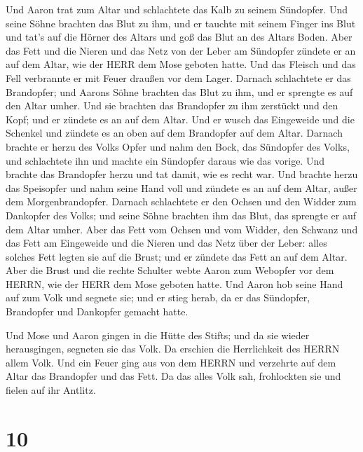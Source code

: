  Und Aaron trat zum Altar und schlachtete das Kalb zu seinem
Sündopfer.  Und seine Söhne brachten das Blut zu ihm, und er
tauchte mit seinem Finger ins Blut und tat's auf die Hörner des Altars
und goß das Blut an des Altars Boden.  Aber das Fett und
die Nieren und das Netz von der Leber am Sündopfer zündete er an auf dem
Altar, wie der HERR dem Mose geboten hatte.  Und das
Fleisch und das Fell verbrannte er mit Feuer draußen vor dem Lager.
 Darnach schlachtete er das Brandopfer; und Aarons Söhne
brachten das Blut zu ihm, und er sprengte es auf den Altar umher.
 Und sie brachten das Brandopfer zu ihm zerstückt und den
Kopf; und er zündete es an auf dem Altar.  Und er wusch das
Eingeweide und die Schenkel und zündete es an oben auf dem Brandopfer
auf dem Altar.  Darnach brachte er herzu des Volks Opfer
und nahm den Bock, das Sündopfer des Volks, und schlachtete ihn und
machte ein Sündopfer daraus wie das vorige.  Und brachte
das Brandopfer herzu und tat damit, wie es recht war.  Und
brachte herzu das Speisopfer und nahm seine Hand voll und zündete es an
auf dem Altar, außer dem Morgenbrandopfer.  Darnach
schlachtete er den Ochsen und den Widder zum Dankopfer des Volks; und
seine Söhne brachten ihm das Blut, das sprengte er auf dem Altar umher.
 Aber das Fett vom Ochsen und vom Widder, den Schwanz und
das Fett am Eingeweide und die Nieren und das Netz über der Leber:
 alles solches Fett legten sie auf die Brust; und er
zündete das Fett an auf dem Altar.  Aber die Brust und die
rechte Schulter webte Aaron zum Webopfer vor dem HERRN, wie der HERR dem
Mose geboten hatte.  Und Aaron hob seine Hand auf zum Volk
und segnete sie; und er stieg herab, da er das Sündopfer, Brandopfer und
Dankopfer gemacht hatte.

 Und Mose und Aaron gingen in die Hütte des Stifts; und da
sie wieder herausgingen, segneten sie das Volk. Da erschien die
Herrlichkeit des HERRN allem Volk.  Und ein Feuer ging aus
von dem HERRN und verzehrte auf dem Altar das Brandopfer und das Fett.
Da das alles Volk sah, frohlockten sie und fielen auf ihr Antlitz.

\hypertarget{section-9}{%
\section{10}\label{section-9}}

